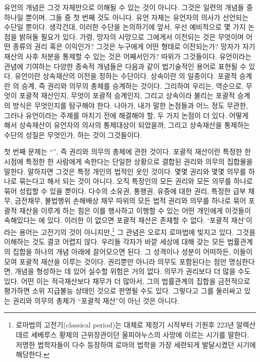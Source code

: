 유언의 개념은 그것 자체만으로 이해될 수 있는 것이 아니다.
그것은 일련의 개념들 중 하나일 뿐이며, 그들 중 첫 번째 것도 아니다.
유언 자체는 유언자의 의사가 선언되는 수단일 뿐이다.
생각건대,
이러한 수단을 논의하기에 앞서,
우선 예비적으로 몇 가지 논점을 밝혀둘 필요가 있다.
가령, 망자의 사망으로 그에게서 이전되는 것은 무엇이며 어떤 종류의
권리 혹은 이익인가? 그것은 누구에게 어떤 형태로 이전되는가?
망자가 자기 재산의 사후 처분을 통제할 수 있는 것은 어째서인가?
따위가 그것들이다.
유언이라는 관념에 기여하는 다양한 종속적 개념들은 다음과 같이 법기술적인
용어로 표현될 수 있다.
유언이란 상속재산의 이전을 정하는 수단이다.
상속이란 의 일종이다.
포괄적 승계란 의 승계, 즉
권리와 의무의 총체를 승계하는 것이다.
그리하여 우리는, 역순으로,
무엇이 포괄적 재산인지, 무엇이 포괄적 승계인지,
그리고 상속이라 불리는 포괄적 승계의 방식은 무엇인지를 탐구해야 한다.
나아가, 내가 말한 논점들과 어느 정도 무관한, 그러나
유언이라는 주제를 마치기 전에 해결해야 할, 두 가지 논점이 더 있다.
어떻게 해서 상속재산이 유언자의 의사의 통제대상이 되었을까,
그리고 상속재산을 통제하는 수단의 성질은 무엇인가, 하는 것이 그것들이다.

첫 번째 문제는 ``'',
즉 권리와 의무의 총체에 관한 것이다.
포괄적 재산이란
특정한 한 시점에 특정한 한 사람에게 속한다는 단일한 상황으로 결합된
권리와 의무의 집합물을 말한다.
말하자면 그것은 특정 개인의 법적인 옷\hanja{[衣服]}인 것이다.
몇몇 권리와 몇몇 의무를 하나로 묶는다고 해서 되는 것이 아니다.
오직 특정인의 모든 권리와 모든 의무를 하나로 묶어 성립할 수 있을 뿐이다.
다수의 소유권, 통행권, 유증에 대한 권리, 특정한 급부 채무, 금전채무,
불법행위 손해배상 채무 따위의 모든 법적 권리와 의무를 하나로 묶어
포괄적 재산을 이루게 하는 힘은
이를 행사하고 이행할 수 있는 어떤 개인에게
이것들이
속해있다는
에 있다.
이러한 이 없으면 포괄적 재산은 존재할 수 없다.
`포괄적 재산'이라는 용어는 고전기의 것이 아니지만,\footnote{%
  로마법의 고전기(classical period)는 대체로 제정기 시작부터
  기원후 223년
  알렉산데르 세베루스 황제의 근위장관이던
  울피아누스의 사망에 이르는 시기를 말한다.
  저명한 법학자들이 다수 등장하여
  로마의 법학을 가장 세련되게 발달시켰던 시기에 해당한다. }
그 관념은 오로지 로마법에 빚지고 있다.
그것을 이해하는 것도 결코 어렵지 않다.
우리들 각자가 바깥 세상에 대해 갖는 모든 법률관계의 집합을
하나의 개념 아래에 끌어모으면 된다.
그 성격이나 성분이 어떠하든, 이들이 모여 포괄적 재산을 이루는 것이다.
권리뿐만 아니라 의무도 포함된다는 점만 명심한다면,
개념을 형성하는 데 있어 실수할 위험은 거의 없다.
의무가 권리보다 더 많을 수도 있다.
어떤 이는 적극재산보다 채무가 더 많아서,
그의 법률관계의 집합을 금전적으로 평가하면 소위 지급불능 상태인 것으로
판명될 수도 있다.
그렇다고 그를 둘러싸고 있는 권리와 의무의 총체가
``포괄적 재산''이 아닌 것은 아니다.

